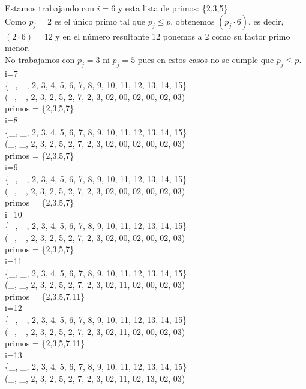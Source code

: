\begin{ejemplo}
Estamos trabajando con $i = 6$ y esta lista de primos: \{2,3,5\}. \\
Como $p_j = 2$ es el único primo tal que $p_j \leq p$, obtenemos $(p_j \cdot 6)$, es decir, $(2 \cdot 6) = 12$ y en el número resultante 12 ponemos a 2 como su factor primo menor. \\
No trabajamos con $p_j = 3$ ni $p_j = 5$ pues en estos casos no se cumple que $p_j \leq p$. \\
i=7 \\ 
\{\_, \_, 2, 3, 4, 5, 6, 7, 8, 9, 10, 11, 12, 13, 14, 15\} \\ 
(\_, \_, 2, 3, 2, 5, 2, 7, 2, 3,  02, 00, 02, 00, 02, 03) \\ 
primos = \{2,3,5,7\} \\ 
i=8 \\ 
\{\_, \_, 2, 3, 4, 5, 6, 7, 8, 9, 10, 11, 12, 13, 14, 15\} \\ 
(\_, \_, 2, 3, 2, 5, 2, 7, 2, 3,  02, 00, 02, 00, 02, 03) \\ 
primos = \{2,3,5,7\} \\ 
i=9 \\ 
\{\_, \_, 2, 3, 4, 5, 6, 7, 8, 9, 10, 11, 12, 13, 14, 15\} \\ 
(\_, \_, 2, 3, 2, 5, 2, 7, 2, 3,  02, 00, 02, 00, 02, 03) \\ 
primos = \{2,3,5,7\} \\ 
i=10 \\ 
\{\_, \_, 2, 3, 4, 5, 6, 7, 8, 9, 10, 11, 12, 13, 14, 15\} \\ 
(\_, \_, 2, 3, 2, 5, 2, 7, 2, 3,  02, 00, 02, 00, 02, 03) \\ 
primos = \{2,3,5,7\} \\ 
i=11 \\ 
\{\_, \_, 2, 3, 4, 5, 6, 7, 8, 9, 10, 11, 12, 13, 14, 15\} \\ 
(\_, \_, 2, 3, 2, 5, 2, 7, 2, 3,  02, 11, 02, 00, 02, 03) \\ 
primos = \{2,3,5,7,11\} \\ 
i=12 \\ 
\{\_, \_, 2, 3, 4, 5, 6, 7, 8, 9, 10, 11, 12, 13, 14, 15\} \\ 
(\_, \_, 2, 3, 2, 5, 2, 7, 2, 3,  02, 11, 02, 00, 02, 03) \\ 
primos = \{2,3,5,7,11\} \\ 
i=13 \\ 
\{\_, \_, 2, 3, 4, 5, 6, 7, 8, 9, 10, 11, 12, 13, 14, 15\} \\ 
(\_, \_, 2, 3, 2, 5, 2, 7, 2, 3,  02, 11, 02, 13, 02, 03) \\ 

\end{ejemplo}

